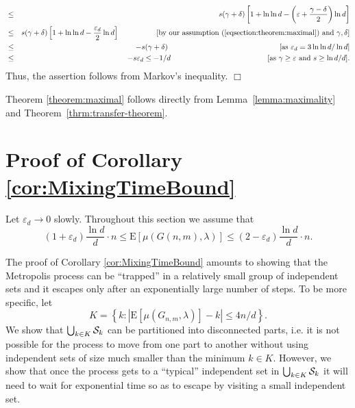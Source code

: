 \documentclass[a4paper,10pt]{article}
\makeatletter
\newenvironment{proof}{\noindent{\bf Proof\@:}}{\hfill $\Box$\\}
\newcommand\eps{\varepsilon}
\newcommand\Erw{\mathrm{E}}
\newcommand\ra{\rightarrow}
\newcommand\bc[1]{\left({#1}\right)}
\newcommand\brk[1]{\left\lbrack{#1}\right\rbrack}
\newcommand\Lem{Lemma}
\newcommand\Thm{Theorem}
\makeatother
\begin{document}
\begin{proof}
\begin{eqnarray*}
		&\leq&s(\gamma+\delta)\brk{1+\ln\ln d-\bc{\eps+\frac{\gamma-\delta}{2}}\ln d}\\
		&\leq&s(\gamma+\delta)\brk{1+\ln\ln d-\frac{\eps_d}2\ln d}\qquad\qquad\quad\mbox{[by our assumption~(\ref{eqsection:theorem:maximal}) and $\gamma,\delta$]}\\
		&\leq&-s(\gamma+\delta)\qquad\qquad\qquad\qquad\qquad\qquad\qquad\quad\mbox{[as $\eps_d=3\ln\ln d/\ln d$]}\\
		&\leq&-s\eps_d\leq-1/d\qquad\qquad\qquad\qquad\qquad\qquad\quad\mbox{[as $\gamma\geq\eps$ and $s\geq \ln d/d$]}.
	\end{eqnarray*}
Thus, the assertion follows from Markov's inequality.
\end{proof}


\noindent
Theorem \ref{theorem:maximal} follows directly from \Lem~\ref{lemma:maximality} and \Thm~\ref{thrm:transfer-theorem}.






\section{Proof of Corollary \ref{cor:MixingTimeBound}}\label{sec:cor:MixingTimeBound}



Let $\eps_d\ra0$ slowly. Throughout this section we assume that
\begin{equation}\label{eq:themuglambda'}
	(1+\eps_d)\frac{\ln d}d\cdot n\leq\Erw\brk{\mu(G(n,m),\lambda)}\leq(2-\eps_d)\frac{\ln d}d\cdot n.
\end{equation}


\noindent
The proof of Corollary \ref{cor:MixingTimeBound} amounts to showing
that the Metropolis process can be ``trapped'' in a relatively
small group of independent sets and it escapes only after an
exponentially large number of steps. To be more specific, let
\begin{equation}\label{eq:TheK}
K=\left\{k:|\Erw\brk{\mu(G_{n,m},\lambda)}-k|\leq {4n}/{d} \right\}.
	\end{equation}
We show that $\bigcup_{k\in K}{\cal S}_k$ can be partitioned into
disconnected parts, i.e.  it is not possible for the process to
move from one part to another without using independent sets of
size much smaller than the minimum $k\in K$. However, we show that
once the process gets to a ``typical'' independent set in $\bigcup_{k\in K}{\cal S}_k$
it will need to wait for exponential time so as to escape by
visiting a small independent set.
\end{document}
